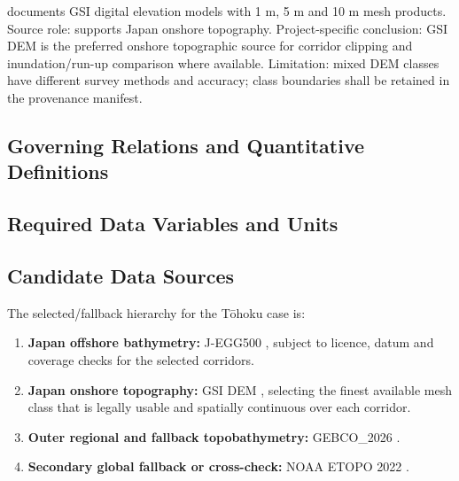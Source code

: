 \textcite{gsiDemDownload} documents GSI digital elevation models with
1 m, 5 m and 10 m mesh products. Source role: supports Japan onshore
topography. Project-specific conclusion: GSI DEM is the preferred
onshore topographic source for corridor clipping and inundation/run-up
comparison where available. Limitation: mixed DEM classes have
different survey methods and accuracy; class boundaries shall be
retained in the provenance manifest.

\subsection{Governing Relations and Quantitative Definitions}
\label{sec:res-dat-geo-governing-relations}

%

\subsection{Required Data Variables and Units}
\label{sec:res-dat-geo-required-data-variables-units}


\subsection{Candidate Data Sources}
\label{sec:res-dat-geo-candidate-data-sources}

The selected/fallback hierarchy for the Tōhoku case is:

\begin{enumerate}
  \item \textbf{Japan offshore bathymetry:} J-EGG500
    \parencite{jodcJegg500}, subject to licence, datum and coverage
    checks for the selected corridors.
  \item \textbf{Japan onshore topography:} GSI DEM
    \parencite{gsiDemDownload}, selecting the finest available mesh
    class that is legally usable and spatially continuous over each
    corridor.
  \item \textbf{Outer regional and fallback topobathymetry:}
    GEBCO\_2026 \parencite{gebco2026grid}.
  \item \textbf{Secondary global fallback or cross-check:}
    NOAA ETOPO 2022 \parencite{noaa2022etopo}.
\end{enumerate}

